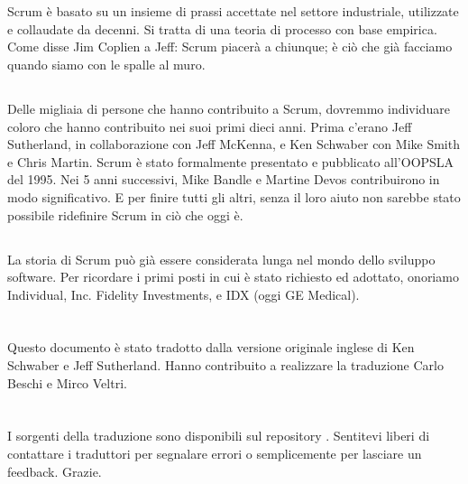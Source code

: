 \section*{\color{Blue}{RINGRAZIAMENTI}}
\label{sec:acknowledgements}

\subsection*{\color{Blue}{GENERALI}}
\label{sec:general}
Scrum \`e basato su un insieme di prassi accettate nel settore industriale, utilizzate e collaudate da decenni. Si
tratta di una teoria di processo con base empirica. Come disse Jim Coplien a Jeff: \flqq Scrum piacer\`a a chiunque; \`e
ci\`o che gi\`a facciamo quando siamo con le spalle al muro.\frqq

\subsection*{\color{Blue}{PERSONE}}
\label{sec:people}
Delle migliaia di persone che hanno contribuito a Scrum, dovremmo individuare coloro che hanno contribuito nei suoi
primi dieci anni. Prima c'erano Jeff Sutherland, in collaborazione con Jeff McKenna, e Ken Schwaber con Mike Smith e
Chris Martin. Scrum \`e stato formalmente presentato e pubblicato all'OOPSLA del 1995. Nei 5 anni successivi, Mike
Bandle e Martine Devos contribuirono in modo significativo. E per finire tutti gli altri, senza il loro aiuto non
sarebbe stato possibile ridefinire Scrum in ci\`o che oggi \`e.

\subsection*{\color{Blue}{STORIA}}
\label{sec:history}
La storia di Scrum pu\`o gi\`a essere considerata lunga nel mondo dello sviluppo software. Per ricordare i primi posti
in cui \`e stato richiesto ed adottato, onoriamo Individual, Inc. Fidelity Investments, e IDX (oggi GE Medical).

\section*{\color{Blue}{TRADUZIONE}}
\label{sec:translation}
Questo documento \`e stato tradotto dalla versione originale inglese di Ken Schwaber e Jeff Sutherland. Hanno contribuito a realizzare la traduzione Carlo Beschi e Mirco Veltri.

\section*{\color{Blue}{NOTE ALLA VERSIONE ITALIANA}}
\label{sec:translationnotes}
I sorgenti della traduzione sono disponibili sul repository . 
Sentitevi liberi di contattare i traduttori per segnalare errori o semplicemente per lasciare un feedback. Grazie.
